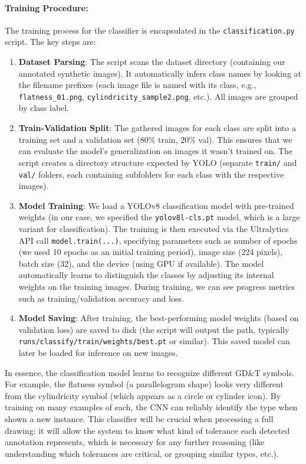 \documentclass[11pt,a4paper]{article}
\begin{document}
\paragraph{Training Procedure:} The training process for the classifier is encapsulated in the \verb|classification.py| script. The key steps are:
\begin{enumerate}
    \item \textbf{Dataset Parsing}: The script scans the dataset directory (containing our annotated synthetic images). It automatically infers class names by looking at the filename prefixes (each image file is named with its class, e.g., \verb|flatness_01.png|, \verb|cylindricity_sample2.png|, etc.). All images are grouped by class label.
    \item \textbf{Train-Validation Split}: The gathered images for each class are split into a training set and a validation set (80\% train, 20\% val). This ensures that we can evaluate the model’s generalization on images it wasn’t trained on. The script creates a directory structure expected by YOLO (separate \verb|train/| and \verb|val/| folders, each containing subfolders for each class with the respective images).
    \item \textbf{Model Training}: We load a YOLOv8 classification model with pre-trained weights (in our case, we specified the \verb|yolov8l-cls.pt| model, which is a large variant for classification). The training is then executed via the Ultralytics API call \verb|model.train(...)|, specifying parameters such as number of epochs (we used 10 epochs as an initial training period), image size (224 pixels), batch size (32), and the device (using GPU if available). The model automatically learns to distinguish the classes by adjusting its internal weights on the training images. During training, we can see progress metrics such as training/validation accuracy and loss.
    \item \textbf{Model Saving}: After training, the best-performing model weights (based on validation loss) are saved to disk (the script will output the path, typically \verb|runs/classify/train/weights/best.pt| or similar). This saved model can later be loaded for inference on new images.
\end{enumerate}

In essence, the classification model learns to recognize different GD\&T symbols. For example, the flatness symbol (a parallelogram shape) looks very different from the cylindricity symbol (which appears as a circle or cylinder icon). By training on many examples of each, the CNN can reliably identify the type when shown a new instance. This classifier will be crucial when processing a full drawing: it will allow the system to know what kind of tolerance each detected annotation represents, which is necessary for any further reasoning (like understanding which tolerances are critical, or grouping similar types, etc.).
\end{document}
